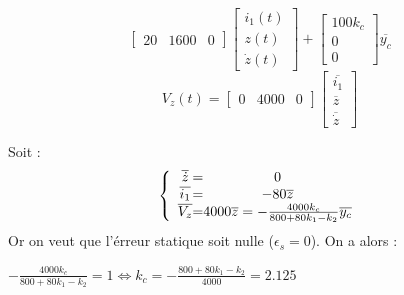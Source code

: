 {{{\begin{center}
\[\begin{bmatrix}
        20             & 1600       & 0
    \end{bmatrix}
    \begin{bmatrix}
        i_{1}(t) \\
        z(t) \\
        \dot{z}(t)    
    \end{bmatrix}
    +
    \begin{bmatrix}
        100k_{c} \\
        0 \\
        0
    \end{bmatrix}
    \overline{y_{c}}
    \] \newline
    \[
    V_{z}(t) = 
    \begin{bmatrix}
        0 & 4000 & 0
    \end{bmatrix}
    \begin{bmatrix}
        \overline{i_{1}} \\
        \overline{z} \\
        \overline{\dot{z}}  
    \end{bmatrix}
    \]
\end{center}
Soit : 
\[
    \left \{
    \begin{array}{c @{=} c}
        \overline{\dot{z}} & 0 \\
        \overline{i_{1}} & -80\overline{z}\\
        \overline{V_{z}} & 4000 \overline{z} = - \frac{4000k_{c}}{800 +80k_{1}-k_{2}}\overline{y_{c}} 
    \end{array}
    \right.
\]
Or on veut que l'érreur statique soit nulle ($\epsilon_{s} = 0$). On a alors : 
\begin{center}
    \LARGE{$
    -\frac{4000k_{c}}{800 +80k_{1}-k_{2}} = 1 \Longleftrightarrow k_{c} = -\frac{800 +80k_{1}-k_{2}}{4000} = 2.125
    $}
\end{center}
\newpage
}}}
